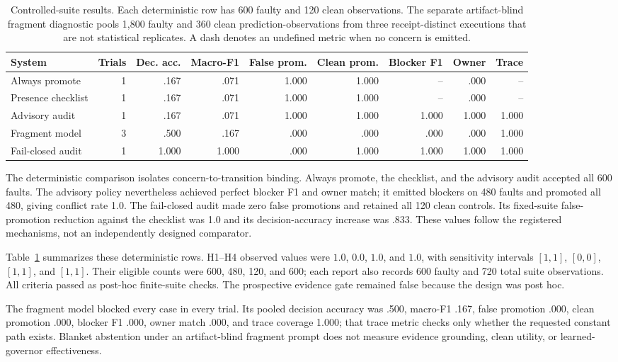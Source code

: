 \documentclass[11pt]{article}
\begin{document}
\begin{table}[!t]
\centering
\small
\begin{tabular}{lrrrrrrrr}
\toprule
System & Trials & Dec. acc. & Macro-F1 & False prom. & Clean prom. & Blocker F1 & Owner & Trace \\
\midrule
Always promote & 1 & .167 & .071 & 1.000 & 1.000 & -- & .000 & -- \\
Presence checklist & 1 & .167 & .071 & 1.000 & 1.000 & -- & .000 & -- \\
Advisory audit & 1 & .167 & .071 & 1.000 & 1.000 & 1.000 & 1.000 & 1.000 \\
Fragment model & 3 & .500 & .167 & .000 & .000 & .000 & .000 & 1.000 \\
Fail-closed audit & 1 & 1.000 & 1.000 & .000 & 1.000 & 1.000 & 1.000 & 1.000 \\
\bottomrule
\end{tabular}
\caption{Controlled-suite results. Each deterministic row has 600 faulty and
120 clean observations. The separate artifact-blind fragment diagnostic pools
1,800 faulty and 360 clean prediction-observations from three receipt-distinct
executions that are not statistical replicates. A dash denotes an undefined
metric when no concern is emitted.}
\label{tab:conformance}
\end{table}

The deterministic comparison isolates concern-to-transition binding. Always
promote, the checklist, and the advisory audit accepted all 600 faults. The
advisory policy nevertheless achieved perfect blocker F1 and owner match; it
emitted blockers on 480 faults and promoted all 480, giving conflict rate 1.0.
The fail-closed audit made zero false promotions and retained all 120 clean
controls. Its fixed-suite false-promotion reduction against the checklist was
1.0 and its decision-accuracy increase was .833. These values follow the
registered mechanisms, not an independently designed comparator.

Table~\ref{tab:conformance} summarizes these deterministic rows. H1--H4
observed values were $1.0$, $0.0$, $1.0$, and $1.0$, with sensitivity
intervals $[1,1]$, $[0,0]$, $[1,1]$, and $[1,1]$. Their eligible counts were
600, 480, 120, and 600; each report also records 600 faulty and 720 total suite
observations. All criteria passed as post-hoc finite-suite checks. The
prospective evidence gate remained false because the design was post hoc.

The fragment model blocked every case in every trial. Its pooled decision
accuracy was .500, macro-F1 .167, false promotion .000, clean promotion .000,
blocker F1 .000, owner match .000, and trace coverage 1.000; that trace metric
checks only whether the requested constant path exists. Blanket abstention
under an artifact-blind fragment prompt does not measure evidence grounding,
clean utility, or learned-governor effectiveness.
\end{document}
